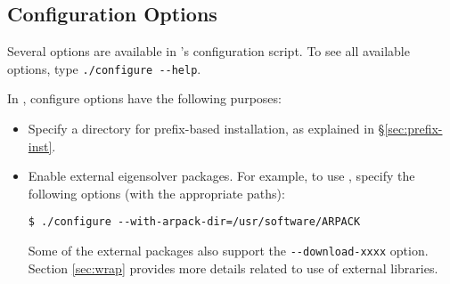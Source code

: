 \subsection{Configuration Options}
\label{sec:opt-inst}

Several options are available in \slepc's configuration script. To see all available options, type \Verb!./configure --help!.

In \slepc, configure options have the following purposes:
\begin{itemize}
\item Specify a directory for prefix-based installation, as explained in \S\ref{sec:prefix-inst}.
\item Enable external eigensolver packages. For example, to use \arpack, specify the following options (with the appropriate paths):
	\begin{Verbatim}[fontsize=\small]
	$ ./configure --with-arpack-dir=/usr/software/ARPACK
	\end{Verbatim}
Some of the external packages also support the \Verb!--download-xxxx! option. Section \ref{sec:wrap} provides more details related to use of external libraries.
\end{itemize}

